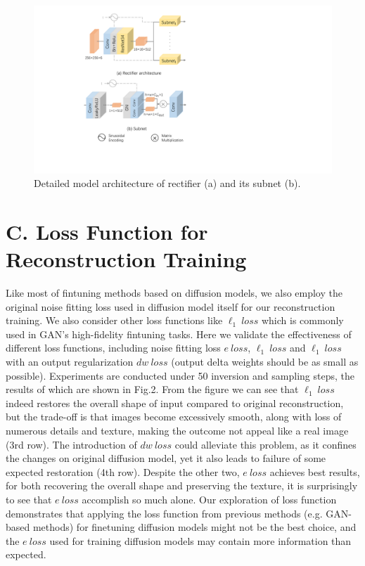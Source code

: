 \documentclass[letterpaper]{article} %
\begin{document}
\begin{figure}[t]
    \centering
    \includegraphics[width=1\columnwidth]{Figs/fig9_row.pdf}
    \caption{Detailed model architecture of rectifier (a) and its subnet (b).}
    \label{fig9}
\end{figure}

\section{C. Loss Function for Reconstruction Training}

Like most of fintuning methods based on diffusion models, we also employ the original noise fitting loss used in diffusion model \cite{ho2020denoising} itself for our reconstruction training.
We also consider other loss functions like $\ell_1 ~loss$ which is commonly used in GAN's high-fidelity fintuning tasks.
Here we validate the effectiveness of different loss functions, including noise fitting loss $e ~loss$, $\ell_1 ~loss$ and $\ell_1 ~loss$ with an output regularization $dw ~loss$ (output delta weights should be as small as possible).
Experiments are conducted under 50 inversion and sampling steps, the results of which are shown in Fig.2. From the figure we can see that $\ell_1 ~loss$ indeed restores the overall shape of input compared to original reconstruction, but the trade-off is that images become excessively smooth, along with loss of numerous details and texture, making the outcome not appeal like a real image (3rd row). The introduction of $dw ~loss$ could alleviate this problem, as it confines the changes on original diffusion model, yet it also leads to failure of some expected restoration (4th row). Despite the other two, $e ~loss$ achieves best results, for both recovering the overall shape and preserving the texture,
it is surprisingly to see that $e ~loss$ accomplish so much alone.
Our exploration of loss function demonstrates that applying the loss function from previous methods (e.g. GAN-based methods) for finetuning diffusion models might not be the best choice, and the $e ~loss$ used for training diffusion models may contain more information than expected.
\end{document}
